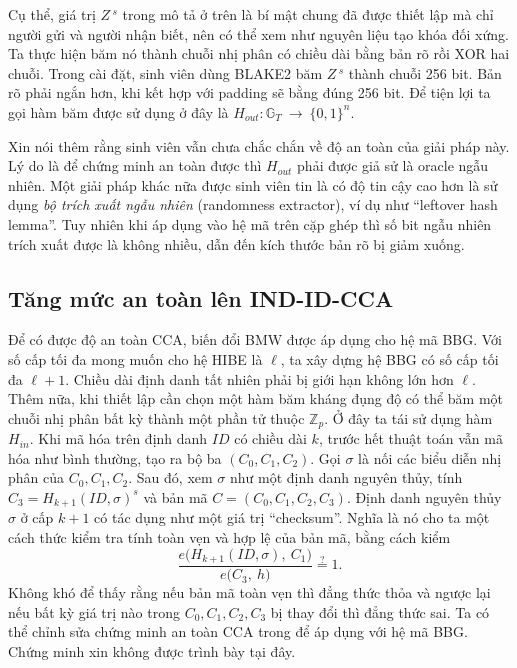 \documentclass[class=report, crop=false]{standalone}
\begin{document}
			Cụ thể, giá trị $Z\,^s$ trong mô tả ở trên là bí mật chung đã được thiết lập mà chỉ người gửi và người nhận biết, nên có thể xem như nguyên liệu tạo khóa đối xứng. Ta thực hiện băm nó thành chuỗi nhị phân có chiều dài bằng bản rõ rồi XOR hai chuỗi. Trong cài đặt, sinh viên dùng BLAKE2 băm $Z\,^s$ thành chuỗi 256 bit. Bản rõ phải ngắn hơn, khi kết hợp với padding sẽ bằng đúng 256 bit. Để tiện lợi ta gọi hàm băm được sử dụng ở đây là $H_{out}: \mathbb{G}_T \ \rightarrow \ \{0, 1 \}^n$.
			
			Xin nói thêm rằng sinh viên vẫn chưa chắc chắn về độ an toàn của giải pháp này. Lý do là để chứng minh an toàn được thì $H_{out}$ phải được giả sử là oracle ngẫu nhiên. Một giải pháp khác nữa được sinh viên tin là có độ tin cậy cao hơn là sử dụng \textit{bộ trích xuất ngẫu nhiên} (randomness extractor), ví dụ như ``leftover hash lemma''. Tuy nhiên khi áp dụng vào hệ mã trên cặp ghép thì số bit ngẫu nhiên trích xuất được là không nhiều, dẫn đến kích thước bản rõ bị giảm xuống.
		\subsection{Tăng mức an toàn lên IND-ID-CCA}
			Để có được độ an toàn CCA, biến đổi BMW được áp dụng cho hệ mã BBG. Với số cấp tối đa mong muốn cho hệ HIBE là $\ell$, ta xây dựng hệ BBG có số cấp tối đa $\ell + 1$. Chiều dài định danh tất nhiên phải bị giới hạn không lớn hơn $\ell$. Thêm nữa, khi thiết lập cần chọn một hàm băm kháng đụng độ có thể băm một chuỗi nhị phân bất kỳ thành một phần tử thuộc $\mathbb{Z}_p$. Ở đây ta tái sử dụng hàm $H_{in}$. Khi mã hóa trên định danh $ID$ có chiều dài $k$, trước hết thuật toán vẫn mã hóa như bình thường, tạo ra bộ ba $(C_0, C_1, C_2)$. Gọi $\sigma$ là nối các biểu diễn nhị phân của $C_0, C_1, C_2$. Sau đó, xem $\sigma$ như một định danh nguyên thủy, tính $C_3 = H_{k + 1}(ID, \sigma)^s$ và bản mã $C = (C_0, C_1, C_2, C_3)$.
			\newpage
			Định danh nguyên thủy $\sigma$ ở cấp $k + 1$ có tác dụng như một giá trị ``checksum''. Nghĩa là nó cho ta một cách thức kiểm tra tính toàn vẹn và hợp lệ của bản mã, bằng cách kiểm
			\[
				\frac{e \Big(H_{k + 1}(ID, \sigma),\ C_1 \Big)}{e \Big(C_3,\ h \Big)} \overset{?}{=} 1.
			\]
			Không khó để thấy rằng nếu bản mã toàn vẹn thì đẳng thức thỏa và ngược lại nếu bất kỳ giá trị nào trong $C_0, C_1, C_2, C_3$ bị thay đổi thì đẳng thức sai. Ta có thể chỉnh sửa chứng minh an toàn CCA trong \cite{DBLP:conf/ccs/BoyenMW05} để áp dụng với hệ mã BBG. Chứng minh xin không được trình bày tại đây.
\end{document}
